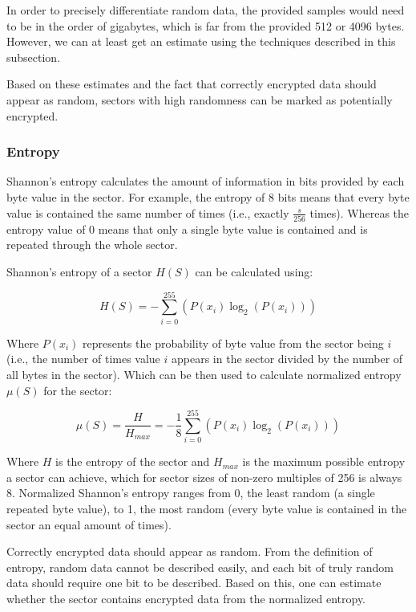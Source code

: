 \documentclass[
  digital, %
  color,   %
  oneside, %
  lof,     %
  nolot,     %
]{fithesis4}
\begin{document}
In order to precisely differentiate random data, the provided samples would need to be in the order of gigabytes, which is far from the provided 512 or 4096 bytes.
However, we can at least get an estimate using the techniques described in this subsection.

Based on these estimates and the fact that correctly encrypted data should appear as random, sectors with high randomness can be marked as potentially encrypted.

\subsubsection{Entropy}
\label{sss:entropy}
Shannon's entropy calculates the amount of information in bits provided by each byte value in the sector.\cite{shannon48}
For example, the entropy of 8 bits means that every byte value is contained the same number of times (i.e., exactly $\frac{s}{256}$ times).
Whereas the entropy value of 0 means that only a single byte value is contained and is repeated through the whole sector. 

Shannon's entropy of a sector $H(S)$ can be calculated using:

\begin{equation}
  H(S) = -\sum_{i=0}^{255}(P(x_i)\log_2(P(x_i)))
  \label{eq:entropy}
\end{equation}

Where $P(x_i)$ represents the probability of byte value from the sector being $i$ (i.e., the number of times value $i$ appears in the sector divided by the number of all bytes in the sector). 
Which can be then used to calculate normalized entropy $\mu(S)$ for the sector:

\begin{equation}
  \mu(S) = \frac{H}{H_{max}} = -\frac{1}{8}\sum_{i=0}^{255}(P(x_i)\log_2(P(x_i)))
  \label{eq:norm-entropy}
\end{equation}


Where $H$ is the entropy of the sector and $H_{max}$ is the maximum possible entropy a sector can achieve, which for sector sizes of non-zero multiples of 256 is always 8.
Normalized Shannon's entropy ranges from 0, the least random (a single repeated byte value), to 1, the most random (every byte value is contained in the sector an equal amount of times).

Correctly encrypted data should appear as random.
From the definition of entropy, random data cannot be described easily, and each bit of truly random data should require one bit to be described.
Based on this, one can estimate whether the sector contains encrypted data from the normalized entropy.
\end{document}
